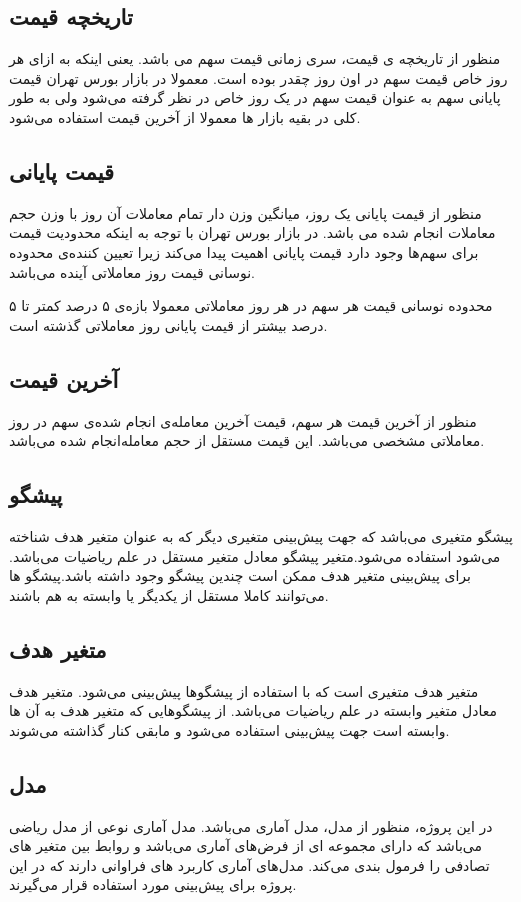 \documentclass[12pt]{report}
\begin{document}
\subsection{تاریخچه قیمت}
منظور از تاریخچه ی قیمت،
سری زمانی
قیمت سهم می باشد. یعنی اینکه به ازای هر روز خاص قیمت سهم در اون روز چقدر بوده است.
معمولا در بازار بورس تهران قیمت پایانی سهم به عنوان قیمت سهم در یک روز خاص در نظر گرفته می‌شود ولی به طور کلی در بقیه بازار ها معمولا از آخرین قیمت استفاده می‌شود.
\subsection{قیمت پایانی}
منظور از
قیمت پایانی
 یک روز، میانگین وزن دار تمام معاملات آن روز با وزن حجم معاملات انجام شده می باشد.
 در بازار بورس تهران با توجه به اینکه محدودیت قیمت برای سهم‌ها وجود دارد قیمت پایانی اهمیت پیدا می‌کند زیرا تعیین کننده‌ی محدوده نوسانی قیمت روز معاملاتی آینده می‌باشد.
 \par
 محدوده نوسانی قیمت هر سهم در هر روز معاملاتی معمولا بازه‌ی ۵ درصد کمتر تا ۵ درصد بیشتر از قیمت پایانی روز معاملاتی گذشته است.

\subsection{آخرین قیمت}
منظور از آخرین قیمت هر سهم، قیمت آخرین معامله‌ی انجام شده‌ی سهم در روز معاملاتی مشخصی می‌باشد.
این قیمت مستقل از حجم معامله‌انجام شده می‌باشد.

\subsection{پیشگو}
پیشگو متغیری می‌باشد که جهت پیش‌بینی متغیری دیگر که به عنوان متغیر هدف شناخته می‌شود استفاده می‌شود.متغیر پیشگو معادل متغیر مستقل در علم ریاضیات می‌باشد.
برای پیش‌بینی متغیر هدف ممکن است چندین پیشگو وجود داشته باشد.پیشگو ها می‌توانند کاملا مستقل از یکدیگر یا وابسته به هم باشند.

\subsection{متغیر هدف}
متغیر هدف متغیری است که با استفاده از پیشگوها پیش‌بینی می‌شود.
متغیر هدف معادل متغیر وابسته در علم ریاضیات می‌باشد.
از پیشگوهایی که متغیر هدف به آن ها وابسته است جهت پیش‌بینی استفاده می‌شود و مابقی کنار گذاشته می‌شوند.

\subsection{مدل}
در این پروژه، منظور از مدل، مدل آماری می‌باشد. مدل آماری نوعی از مدل ریاضی می‌باشد که دارای مجموعه ای از فرض‌های آماری می‌باشد و روابط بین متغیر های تصادفی را فرمول بندی می‌کند.
مدل‌های آماری کاربرد های فراوانی دارند که در این پروژه برای پیش‌بینی مورد استفاده قرار می‌گیرند.
\end{document}
